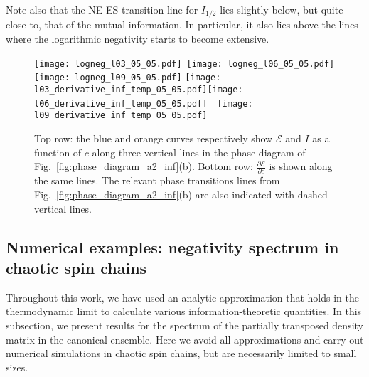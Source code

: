 \documentclass[a4paper,11pt]{article}
\newcommand\sE{{\ensuremath{{\mathcal E}}}}
\begin{document}
\begin{enumerate}
\begin{enumerate}
Note also that the NE-ES transition line for $I_{1/2}$ lies slightly below, but quite close to, that of the mutual information. In particular, it also lies above the lines where the logarithmic negativity starts to become extensive. 
\end{enumerate} 

\begin{figure}[]
\texttt{[image: logneg\_l03\_05\_05.pdf]}~\texttt{[image: logneg\_l06\_05\_05.pdf]}\texttt{[image: logneg\_l09\_05\_05.pdf]}
\vspace{0.3cm}
 \texttt{[image: l03\_derivative\_inf\_temp\_05\_05.pdf]}\hspace{0.4cm}\texttt{[image: l06\_derivative\_inf\_temp\_05\_05.pdf]}~~\texttt{[image: l09\_derivative\_inf\_temp\_05\_05.pdf]}
\caption{Top row: the blue and orange curves respectively show $\sE$ and $I$ as a function of $c$ along three vertical lines in the phase diagram of Fig.~\ref{fig:phase_diagram_a2_inf}(b). Bottom row: $\frac{\partial \sE}{\partial c}$ is shown along the same lines. The relevant phase transitions lines from Fig.~\ref{fig:phase_diagram_a2_inf}(b) are also indicated with dashed vertical lines.}
\label{fig:E_I_plots}
\end{figure} 

 
\subsection{Numerical examples: negativity spectrum in chaotic spin chains}

Throughout this work, we have used an analytic approximation that holds in the thermodynamic limit to calculate various information-theoretic quantities. In this subsection, we present results for the spectrum of the partially transposed density matrix in the canonical ensemble. Here we avoid all approximations and carry out numerical simulations in chaotic spin chains, but are necessarily limited to small sizes. 


\end{enumerate}
\end{document}
